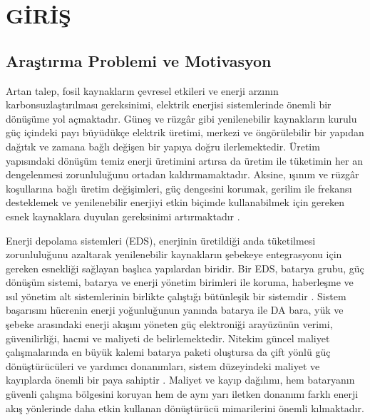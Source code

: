 \chapter{GİRİŞ}
\label{chap:giris}

\section{Araştırma Problemi ve Motivasyon}
\label{sec:giris-problem}

Artan talep, fosil kaynakların çevresel etkileri ve enerji arzının karbonsuzlaştırılması gereksinimi, elektrik enerjisi sistemlerinde önemli bir dönüşüme yol açmaktadır. Güneş ve rüzgâr gibi yenilenebilir kaynakların kurulu güç içindeki payı büyüdükçe elektrik üretimi, merkezi ve öngörülebilir bir yapıdan dağıtık ve zamana bağlı değişen bir yapıya doğru ilerlemektedir. Üretim yapısındaki dönüşüm temiz enerji üretimini artırsa da üretim ile tüketimin her an dengelenmesi zorunluluğunu ortadan kaldırmamaktadır. Aksine, ışınım ve rüzgâr koşullarına bağlı üretim değişimleri, güç dengesini korumak, gerilim ile frekansı desteklemek ve yenilenebilir enerjiyi etkin biçimde kullanabilmek için gereken esnek kaynaklara duyulan gereksinimi artırmaktadır \citep{Chen2009,Aneke2016,IEAPVPS2024}.

Enerji depolama sistemleri (EDS), enerjinin üretildiği anda tüketilmesi zorunluluğunu azaltarak yenilenebilir kaynakların şebekeye entegrasyonu için gereken esnekliği sağlayan başlıca yapılardan biridir. Bir EDS, batarya grubu, güç dönüşüm sistemi, batarya ve enerji yönetim birimleri ile koruma, haberleşme ve ısıl yönetim alt sistemlerinin birlikte çalıştığı bütünleşik bir sistemdir \citep{Hannan2017,Plett2015}. Sistem başarısını hücrenin enerji yoğunluğunun yanında batarya ile DA bara, yük ve şebeke arasındaki enerji akışını yöneten güç elektroniği arayüzünün verimi, güvenilirliği, hacmi ve maliyeti de belirlemektedir. Nitekim güncel maliyet çalışmalarında en büyük kalemi batarya paketi oluştursa da çift yönlü güç dönüştürücüleri ve yardımcı donanımları, sistem düzeyindeki maliyet ve kayıplarda önemli bir paya sahiptir \citep{Ramasamy2023,Lazard2024}. Maliyet ve kayıp dağılımı, hem bataryanın güvenli çalışma bölgesini koruyan hem de aynı yarı iletken donanımı farklı enerji akış yönlerinde daha etkin kullanan dönüştürücü mimarilerini önemli kılmaktadır.

